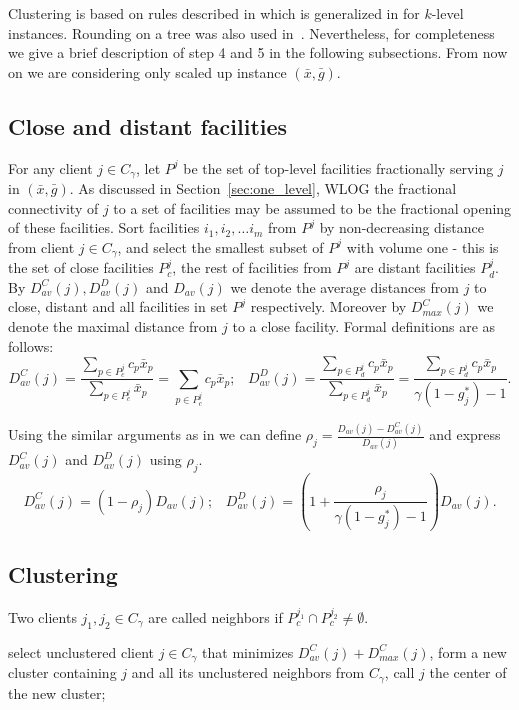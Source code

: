 \documentclass{llncs}
\begin{document}
Clustering is based on rules described in \cite{Chudak} which is generalized in \cite{Rybicki} for $k$-level instances.
Rounding on a tree was also used in~\cite{Rybicki}. Nevertheless, for completeness we give a brief description of step 4 and 5 in the following subsections.
From now on we are considering only scaled up instance $(\bar{x}, \bar{g})$.

\subsection{Close and distant facilities}

For any client $j \in C_{\gamma}$, let $P^j$ be the set of top-level facilities fractionally serving $j$ in $(\bar{x}, \bar{g})$.
As discussed in Section~\ref{sec:one_level}, WLOG the fractional connectivity of $j$ to a set of facilities may be assumed to be
the fractional opening of these facilities.
Sort facilities $i_1, i_2, \dots i_m$ {from} $P^j$ by non-decreasing distance from client $j \in C_{\gamma}$,
and select the smallest subset of $P^j$ with volume one - this is the set of close facilities $P_c^{j}$,
the rest of facilities {from} $P^j$ are distant facilities $P_d^{j}$.
By $D_{av}^{C}(j), D_{av}^{D}(j)$ and $D_{av}(j)$ we denote the average distances from $j$ to close, distant and all facilities in set $P^j$ {respectively}.
Moreover by $D_{max}^{C}(j)$ we denote the maximal distance from $j$ to a close facility. Formal definitions are as follows:
$$D_{av}^{C}(j) = \frac{\sum_{p \in P_c^{j}} c_p \bar{x}_p}{\sum_{p \in P_c^{j}}\bar{x}_p} = \sum_{p \in P_c^{j}} c_p \bar{x}_p; \; \; \; D_{av}^{D}(j) = \frac{\sum_{p \in P_d^{j}} c_p \bar{x}_p}{\sum_{p \in P_d^{j}}\bar{x}_p} = \frac{\sum_{p \in P_d^{j}} c_p \bar{x}_p}{\gamma (1 - g_j^*) - 1}.$$

Using the similar arguments as in \cite{Ghodsi} we can define $\rho_j = \frac{D_{av}(j) - D_{av}^{C}(j)}{D_{av}(j)}$ and express $D_{av}^{C}(j)$ and $D_{av}^{D}(j)$ using $\rho_j$. $$D_{av}^{C}(j) = (1 - \rho_j) D_{av}(j); \; \; \; D_{av}^{D}(j) = (1 + \frac{\rho_j}{\gamma(1 - g_j^*) - 1}) D_{av}(j).$$

\subsection{Clustering}

Two clients $j_1, j_2 \in C_{\gamma}$ are called neighbors if $P_c^{j_1} \cap P_c^{j_2} \neq \emptyset$.
\begin{algorithmic}[1]
  \STATE select unclustered client $j \in C_{\gamma}$ that minimizes $D_{av}^{C}(j) + D_{max}^{C}(j)$,
  \STATE form a new cluster containing $j$ and all its unclustered neighbors from $C_{\gamma}$,
  \STATE call $j$ the center of the new cluster;
 \ENDWHILE
\end{algorithmic}
\end{document}
